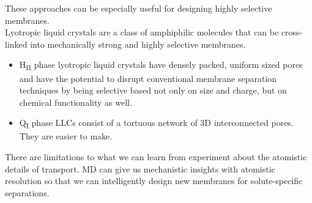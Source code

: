 \documentclass{article}
\begin{document}

  These approaches can be especially useful for designing highly selective membranes. \\


  Lyotropic liquid crystals are a class of amphiphilic molecules that can be cross-linked
  into mechanically strong and highly selective membranes.
  \begin{itemize}
  	\item H\textsubscript{II} phase lyotropic liquid crystals have densely packed, uniform
	sized pores and have the potential to disrupt conventional membrane separation
	techniques by being selective based not only on size and charge, but on chemical
	functionality as well.
	\item Q\textsubscript{I} phase LLCs consist of a tortuous network of 3D interconnected
	pores. They are easier to make.
  \end{itemize}
  

  There are limitations to what we can learn from experiment about the atomistic details of transport.
  MD can give us mechanistic insights with
  atomistic resolution so that we can intelligently design new membranes for 
  solute-specific separations.\\
\end{document}
